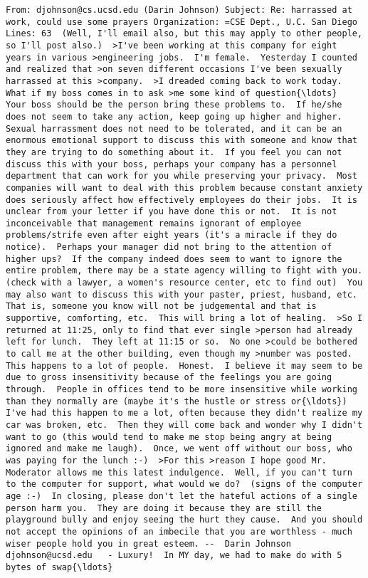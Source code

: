 \documentclass[11pt]{article}
\begin{document}
\begin{Verbatim}[commandchars=\\\{\}]
From: djohnson@cs.ucsd.edu (Darin Johnson) Subject: Re: harrassed at work, could use some prayers Organization: =CSE Dept., U.C. San Diego Lines: 63  (Well, I'll email also, but this may apply to other people, so I'll post also.)  >I've been working at this company for eight years in various >engineering jobs.  I'm female.  Yesterday I counted and realized that >on seven different occasions I've been sexually harrassed at this >company.  >I dreaded coming back to work today.  What if my boss comes in to ask >me some kind of question{\ldots}  Your boss should be the person bring these problems to.  If he/she does not seem to take any action, keep going up higher and higher. Sexual harrassment does not need to be tolerated, and it can be an enormous emotional support to discuss this with someone and know that they are trying to do something about it.  If you feel you can not discuss this with your boss, perhaps your company has a personnel department that can work for you while preserving your privacy.  Most companies will want to deal with this problem because constant anxiety does seriously affect how effectively employees do their jobs.  It is unclear from your letter if you have done this or not.  It is not inconceivable that management remains ignorant of employee problems/strife even after eight years (it's a miracle if they do notice).  Perhaps your manager did not bring to the attention of higher ups?  If the company indeed does seem to want to ignore the entire problem, there may be a state agency willing to fight with you.  (check with a lawyer, a women's resource center, etc to find out)  You may also want to discuss this with your paster, priest, husband, etc.  That is, someone you know will not be judgemental and that is supportive, comforting, etc.  This will bring a lot of healing.  >So I returned at 11:25, only to find that ever single >person had already left for lunch.  They left at 11:15 or so.  No one >could be bothered to call me at the other building, even though my >number was posted.  This happens to a lot of people.  Honest.  I believe it may seem to be due to gross insensitivity because of the feelings you are going through.  People in offices tend to be more insensitive while working than they normally are (maybe it's the hustle or stress or{\ldots}) I've had this happen to me a lot, often because they didn't realize my car was broken, etc.  Then they will come back and wonder why I didn't want to go (this would tend to make me stop being angry at being ignored and make me laugh).  Once, we went off without our boss, who was paying for the lunch :-)  >For this >reason I hope good Mr. Moderator allows me this latest indulgence.  Well, if you can't turn to the computer for support, what would we do?  (signs of the computer age :-)  In closing, please don't let the hateful actions of a single person harm you.  They are doing it because they are still the playground bully and enjoy seeing the hurt they cause.  And you should not accept the opinions of an imbecile that you are worthless - much wiser people hold you in great esteem. --  Darin Johnson djohnson@ucsd.edu   - Luxury!  In MY day, we had to make do with 5 bytes of swap{\ldots} 

    \end{Verbatim}
\end{document}
